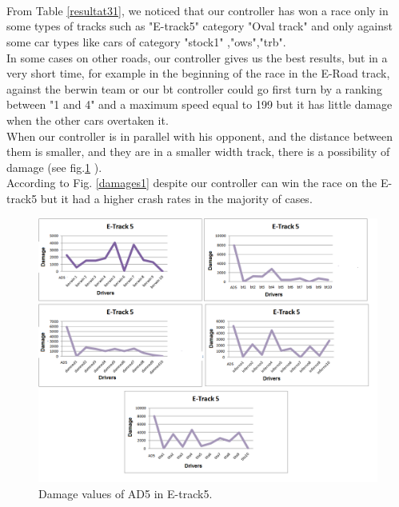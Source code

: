 \documentclass{llncs}
\begin{document}
\paragraph{\\}	
From Table \ref {resultat31}, we noticed that our controller has won a race only in some types of tracks such as "E-track5" category "Oval track" and only against some car types like cars of category "stock1" ,"ows","trb".
\\

In some cases on other roads, our controller gives us the best results, but in a very short time, for example in the beginning of the race in the E-Road track, against the berwin team or our bt controller could go first turn by a ranking between "1 and 4" and a maximum speed equal to 199 but it has little damage when the other cars overtaken it.
\\

When our controller is in parallel with his opponent, and the distance between them is smaller, and they are in a smaller width track,  there is a possibility of  damage (see fig.\ref{damages} ).
\\

According to Fig. \ref{damages1}  despite our controller can win the race on the E-track5 but it had a higher crash rates in the majority of cases.

\newpage
\begin{figure}[h!]
	
	\centering
	\includegraphics[width=1\textwidth]{fig/damageRace.PNG}
	\begin{minipage}{10cm}
		\centering
		\caption{\footnotesize Damage values of AD5 in E-track5.}
		\label{damages}
	\end{minipage} 
\end{figure}
\end{document}
